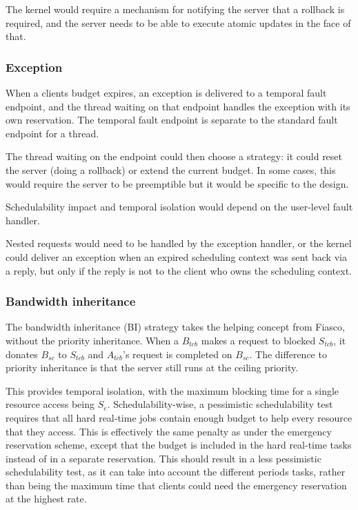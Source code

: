 The kernel would require a mechanism for notifying the server that a rollback is required, and the server needs to be able to execute atomic updates in the face of that.

\subsubsection{Exception}

When a clients budget expires, an exception is delivered to a temporal fault endpoint, and the thread waiting on that endpoint handles the exception with its own reservation.
The temporal fault endpoint is separate to the standard fault endpoint for a thread.

The thread waiting on the endpoint could then choose a strategy: it could reset the server (doing a rollback) or extend the current budget.
In some cases, this would require the server to be preemptible but it would be specific to the design.

Schedulability impact and temporal isolation would depend on the user-level fault handler.

Nested requests would need to be handled by the exception handler, or the kernel could deliver an exception when an expired scheduling context was sent back via a reply, but only if the reply is not to the client who owns the scheduling context.


\subsubsection{Bandwidth inheritance}
\label{sec:bandwidth-inheritance}

The bandwidth inheritance (BI) strategy takes the helping concept from Fiasco, without the priority inheritance.
When a $B_{tcb}$ makes a request to blocked $S_{tcb}$, it donates $B_{sc}$ to $S_{tcb}$ and $A_{tcb}$'s request is completed on $B_{sc}$.
The difference to priority inheritance is that the server still runs at the ceiling priority.

This provides temporal isolation, with the maximum blocking time for a single resource access being $S_{e}$.
Schedulability-wise, a pessimistic schedulability test requires that all hard real-time jobs contain enough budget to help every resource that they access.
This is effectively the same penalty as under the emergency reservation scheme, except that the budget is included in the hard real-time tasks instead of in a separate reservation.
This should result in a less pessimistic schedulability test, as it can take into account the different periods tasks, rather than being the maximum time that clients could need the emergency reservation at the highest rate.

